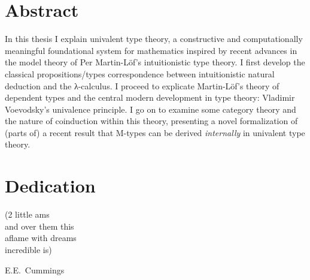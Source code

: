 \documentclass[12pt,twoside]{reedthesis}
\begin{document}

\tableofcontents

\chapter*{Abstract}

In this thesis I explain univalent type theory, a constructive and
computationally meaningful foundational system for mathematics inspired by
recent advances in the model theory of Per Martin-L\"of's intuitionistic type
theory. I first develop the classical propositions/types correspondence between
intuitionistic natural deduction and the λ-calculus. I proceed to explicate
Martin-L\"of's theory of dependent types and the central modern development in
type theory: Vladimir Voevodsky's univalence principle. I go on to examine some
category theory and the nature of coinduction within this theory, presenting a
novel formalization of (parts of) a recent result that M-types can be derived
\textit{internally} in univalent type theory.

\chapter*{Dedication}

\setlength{\epigraphwidth}{0.25\textwidth}
\epigraph{

  (2 little ams \\
  and over them this \\
  aflame with dreams \\
  incredible is)
}{E.E.\ Cummings}
\end{document}
